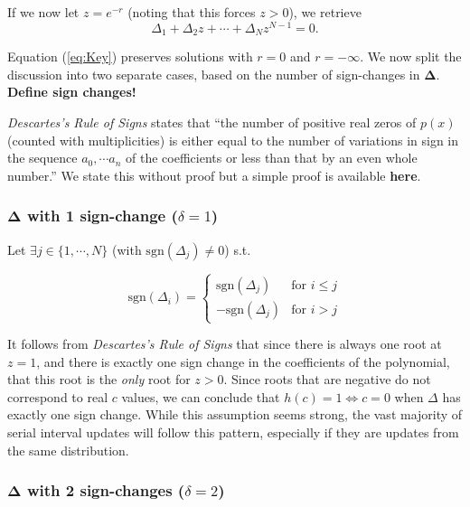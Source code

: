 \documentclass[10pt,journal,compsoc]{IEEEtran}
\begin{document}
If we now let $z = e^{-r}$ (noting that this forces $z>0$), we retrieve
\begin{equation}\label{eq:Poly}
    \Delta_1 +\Delta_2 z + \cdots +\Delta_{N}z^{N-1} = 0.
\end{equation}



Equation (\ref{eq:Key}) preserves solutions with $r=0$ and $r=-\infty$. We now split the discussion into two separate cases, based on the number of sign-changes in $\boldsymbol{\Delta}$. \textbf{Define sign changes!}

\textit{Descartes's Rule of Signs} states that ``the number of positive real zeros of $p(x)$ (counted with multiplicities) is either equal to the number of variations in sign in the sequence $a_0, \cdots a_n$ of the coefficients or less than that by an even whole number.'' We state this without proof but a simple proof is available \textbf{here}.

\subsubsection*{$\boldsymbol{\Delta}$ with 1 sign-change ($\delta = 1$)}

Let $\exists j \in \{ 1, \cdots,  N \}$ (with $\mathrm{sgn}(\Delta_j) \neq 0$) s.t.

\begin{equation}
  \mathrm{sgn}(\Delta_i) =
    \begin{cases}
      \mathrm{sgn}(\Delta_j) & \text{for } i \leq j\\
      -\mathrm{sgn}(\Delta_j) & \text{for } i > j
    \end{cases}       
\end{equation}

It follows from \textit{Descartes's Rule of Signs} that since there is always one root at $z=1$, and there is exactly one sign change in the coefficients of the polynomial, that this root is the \textit{only} root for $z>0$. Since roots that are negative do not correspond to real $c$ values, we can conclude that $h(c) = 1 \iff c = 0$ when $\Delta$ has exactly one sign change. While this assumption seems strong, the vast majority of serial interval updates will follow this pattern, especially if they are updates from the same distribution.

\subsubsection*{$\boldsymbol{\Delta}$ with 2 sign-changes ($\delta = 2$)}
\end{document}
